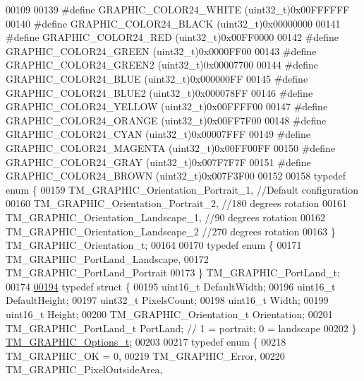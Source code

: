\begin{DoxyCode}
00109 
00139 \textcolor{preprocessor}{#define GRAPHIC\_COLOR24\_WHITE       (uint32\_t)0x00FFFFFF}
00140 \textcolor{preprocessor}{#define GRAPHIC\_COLOR24\_BLACK       (uint32\_t)0x00000000}
00141 \textcolor{preprocessor}{#define GRAPHIC\_COLOR24\_RED         (uint32\_t)0x00FF0000}
00142 \textcolor{preprocessor}{#define GRAPHIC\_COLOR24\_GREEN       (uint32\_t)0x0000FF00}
00143 \textcolor{preprocessor}{#define GRAPHIC\_COLOR24\_GREEN2      (uint32\_t)0x00007700}
00144 \textcolor{preprocessor}{#define GRAPHIC\_COLOR24\_BLUE        (uint32\_t)0x000000FF}
00145 \textcolor{preprocessor}{#define GRAPHIC\_COLOR24\_BLUE2       (uint32\_t)0x000078FF}
00146 \textcolor{preprocessor}{#define GRAPHIC\_COLOR24\_YELLOW      (uint32\_t)0x00FFFF00}
00147 \textcolor{preprocessor}{#define GRAPHIC\_COLOR24\_ORANGE      (uint32\_t)0x00FF7F00}
00148 \textcolor{preprocessor}{#define GRAPHIC\_COLOR24\_CYAN        (uint32\_t)0x00007FFF}
00149 \textcolor{preprocessor}{#define GRAPHIC\_COLOR24\_MAGENTA     (uint32\_t)0x00FF00FF}
00150 \textcolor{preprocessor}{#define GRAPHIC\_COLOR24\_GRAY        (uint32\_t)0x007F7F7F}
00151 \textcolor{preprocessor}{#define GRAPHIC\_COLOR24\_BROWN       (uint32\_t)0x007F3F00}
00152 
00158 \textcolor{keyword}{typedef} \textcolor{keyword}{enum} \{
00159     TM\_GRAPHIC\_Orientation\_Portrait\_1,  \textcolor{comment}{//Default configuration}
00160     TM\_GRAPHIC\_Orientation\_Portrait\_2,  \textcolor{comment}{//180 degrees rotation}
00161     TM\_GRAPHIC\_Orientation\_Landscape\_1, \textcolor{comment}{//90 degrees rotation}
00162     TM\_GRAPHIC\_Orientation\_Landscape\_2  \textcolor{comment}{//270 degrees rotation}
00163 \} TM\_GRAPHIC\_Orientation\_t;
00164 
00170 \textcolor{keyword}{typedef} \textcolor{keyword}{enum} \{
00171     TM\_GRAPHIC\_PortLand\_Landscape,
00172     TM\_GRAPHIC\_PortLand\_Portrait
00173 \} TM\_GRAPHIC\_PortLand\_t;
00174 
\hypertarget{tm__stm32f4__graphic_8h_source_l00194}{}\hyperlink{struct_t_m___g_r_a_p_h_i_c___options__t}{00194} \textcolor{keyword}{typedef} \textcolor{keyword}{struct }\{
00195     uint16\_t DefaultWidth;
00196     uint16\_t DefaultHeight;
00197     uint32\_t PixelsCount;
00198     uint16\_t Width;
00199     uint16\_t Height;
00200     TM\_GRAPHIC\_Orientation\_t Orientation; 
00201     TM\_GRAPHIC\_PortLand\_t PortLand; \textcolor{comment}{// 1 = portrait; 0 = landscape}
00202 \} \hyperlink{struct_t_m___g_r_a_p_h_i_c___options__t}{TM\_GRAPHIC\_Options\_t};
00203 
00217 \textcolor{keyword}{typedef} \textcolor{keyword}{enum} \{
00218     TM\_GRAPHIC\_OK = 0,
00219     TM\_GRAPHIC\_Error,
00220     TM\_GRAPHIC\_PixelOutsideArea,

\end{DoxyCode}
